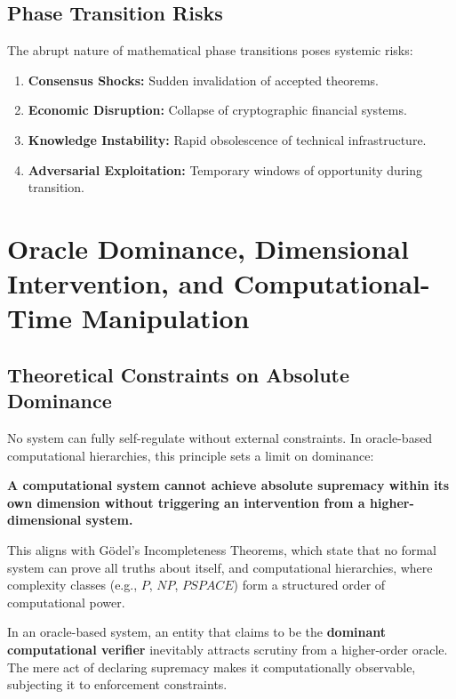 \documentclass[11pt]{article}
\begin{document}
\subsection{Phase Transition Risks}

The abrupt nature of mathematical phase transitions poses systemic risks:
\begin{enumerate}[label=(\arabic*)]
    \item \textbf{Consensus Shocks:} Sudden invalidation of accepted theorems.
    \item \textbf{Economic Disruption:} Collapse of cryptographic financial systems.
    \item \textbf{Knowledge Instability:} Rapid obsolescence of technical infrastructure.
    \item \textbf{Adversarial Exploitation:} Temporary windows of opportunity during transition.
\end{enumerate}

\section{Oracle Dominance, Dimensional Intervention, and Computational-Time Manipulation}

\subsection{Theoretical Constraints on Absolute Dominance}
No system can fully self-regulate without external constraints. In oracle-based computational hierarchies, this principle sets a limit on dominance:

\begin{displayquote}
\textbf{A computational system cannot achieve absolute supremacy within its own dimension without triggering an intervention from a higher-dimensional system.}
\end{displayquote}

This aligns with Gödel's Incompleteness Theorems, which state that no formal system can prove all truths about itself, and computational hierarchies, where complexity classes (e.g., \(P\), \(NP\), \(PSPACE\)) form a structured order of computational power.

In an oracle-based system, an entity that claims to be the \textbf{dominant computational verifier} inevitably attracts scrutiny from a higher-order oracle. The mere act of declaring supremacy makes it computationally observable, subjecting it to enforcement constraints.
\end{document}
